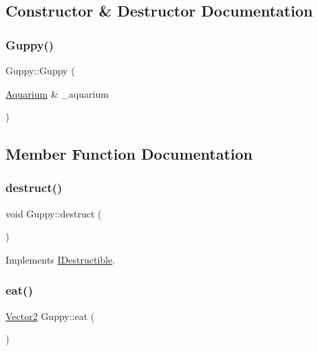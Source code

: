 \subsection{Constructor \& Destructor Documentation}
\mbox{\label{class_guppy_a6759d8e672846fcabdfee3df44e06275}} 
\subsubsection{\texorpdfstring{Guppy()}{Guppy()}}
{\footnotesize\ttfamily Guppy\+::\+Guppy (\begin{DoxyParamCaption}\item[{\mbox{\hyperlink{class_aquarium}{Aquarium}} \&}]{\+\_\+aquarium }\end{DoxyParamCaption})}



\subsection{Member Function Documentation}
\mbox{\label{class_guppy_a26bc11223497fef2ae795283a5682407}} 
\subsubsection{\texorpdfstring{destruct()}{destruct()}}
{\footnotesize\ttfamily void Guppy\+::destruct (\begin{DoxyParamCaption}{ }\end{DoxyParamCaption})\hspace{0.3cm}{\ttfamily [virtual]}}



Implements \mbox{\hyperlink{class_i_destructible_a63016d1bb4daa0a726fc8add9a0be62d}{I\+Destructible}}.

\mbox{\label{class_guppy_aaeab888b423fd0ea3cc911b974b04f48}} 
\subsubsection{\texorpdfstring{eat()}{eat()}}
{\footnotesize\ttfamily \mbox{\hyperlink{struct_vector2}{Vector2}} Guppy\+::eat (\begin{DoxyParamCaption}{ }\end{DoxyParamCaption})\hspace{0.3cm}{\ttfamily [virtual]}}



